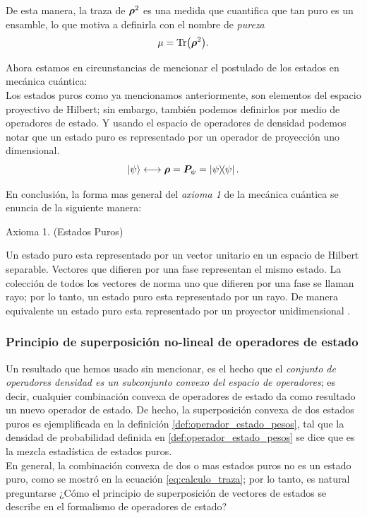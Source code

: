 \documentclass[../Main.tex]{subfiles}
\begin{document}
De esta manera, la traza de $\bm{\rho}^2$ es una medida que cuantifica que tan puro es un ensamble, lo que motiva a definirla con el nombre de \emph{pureza}
\begin{equation}
    \mu = \Tr(\bm{\rho}^2).
    \label{def:pureza}
\end{equation}

Ahora estamos en circunstancias de mencionar el postulado de los estados en mecánica cuántica:\\ Los estados puros como ya mencionamos anteriormente, son elementos del espacio proyectivo de Hilbert; sin embargo, también podemos definirlos por medio de operadores de estado. Y usando el espacio de operadores de densidad podemos notar que un estado puro es representado por un operador de proyección uno dimensional.
\begin{equation}
    \ket{\psi}\longleftrightarrow \bm{\rho} = \bm{P}_{\psi}=\op{\psi}.
\end{equation}

En conclusión, la forma mas general del \emph{axioma 1} de la mecánica cuántica se enuncia de la siguiente manera:

Axioma 1. (Estados Puros)

Un estado puro esta representado por un vector unitario en un espacio de Hilbert separable. Vectores que difieren por una fase representan el mismo estado. La colección de todos los vectores de norma uno que difieren por una fase se llaman rayo; por lo tanto, un estado puro esta representado por un rayo. De manera equivalente un estado puro esta representado por un proyector unidimensional \cite{DellAntonio}.

\subsubsection{Principio de superposición no-lineal de operadores de estado}

Un resultado que hemos usado sin mencionar, es el hecho que el \emph{conjunto de operadores densidad es un subconjunto convexo del espacio de operadores}; es decir, cualquier combinación convexa de operadores de estado da como resultado un nuevo operador de estado. De hecho, la superposición convexa de dos estados puros es ejemplificada en la definición \eqref{def:operador_estado_pesos}, tal que la densidad de probabilidad definida en \eqref{def:operador_estado_pesos} se dice que es la mezcla estadística de estados puros.\\ En general, la combinación convexa de dos o mas estados puros no es un estado puro, como se mostró en la ecuación \eqref{eq:calculo_traza}; por lo tanto, es natural preguntarse ¿Cómo el principio de superposición de vectores de estados se describe en el formalismo de operadores de estado?
\end{document}
